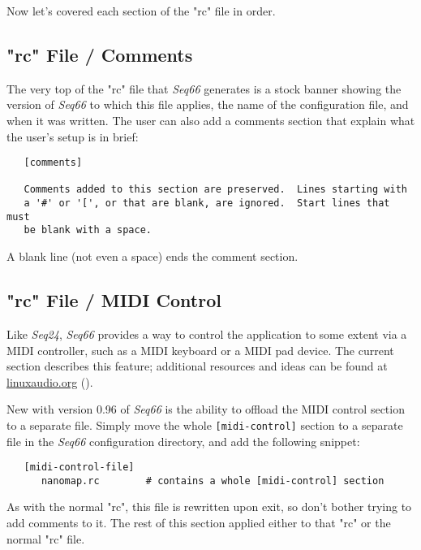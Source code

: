    Now let's covered each section of the "rc" file in order.

\subsection{"rc" File / Comments}
\label{subsec:seq66_rc_file_midi_comments}

   The very top of the "rc" file that \textsl{Seq66} generates is a stock
   banner showing the version of \textsl{Seq66} to which this file
   applies, the name of the configuration file, and when it was written.  The
   user can also add a comments section that explain what the user's setup is
   in brief:

   \begin{verbatim}
   [comments]

   Comments added to this section are preserved.  Lines starting with
   a '#' or '[', or that are blank, are ignored.  Start lines that must
   be blank with a space.
   \end{verbatim}

   A blank line (not even a space) ends the comment section.

\subsection{"rc" File / MIDI Control}
\label{subsec:seq66_rc_file_midi_control}

   Like \textsl{Seq24}, \textsl{Seq66} provides a way to control the
   application to some extent via a MIDI controller, such as a MIDI keyboard or
   a MIDI pad device.  The current section describes this feature;
   additional resources and ideas can be found at \url{linuxaudio.org}
   (\cite{midicontrol}).

   New with version 0.96 of \textsl{Seq66} is the ability
   to offload the MIDI control section to a separate file.  Simply move
   the whole \texttt{[midi-control]} section to a separate file in
   the \textsl{Seq66} configuration directory, and add the following
   snippet:

   \begin{verbatim}
   [midi-control-file]
      nanomap.rc        # contains a whole [midi-control] section
   \end{verbatim}

   As with the normal "rc", this file is rewritten upon exit, so
   don't bother trying to add comments to it.  The rest of this section
   applied either to that "rc" or the normal "rc" file.

